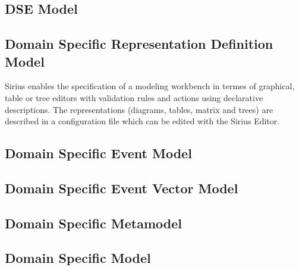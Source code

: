 \documentclass{gemoc} %
\begin{document}

\subsection{DSE Model}
\label{sec:DSE_Model}


\subsection{Domain Specific  Representation Definition Model}
\label{sec:Domain_Specific__Representation_Definition_Model}
Sirius enables the specification of a modeling workbench in termes of graphical, table or tree editors with validation rules and actions using declarative descriptions. The representations (diagrams, tables, matrix and trees) are described in a configuration file which can be edited with the Sirius Editor.

\subsection{Domain Specific Event Model}
\label{sec:Domain_Specific_Event_Model}


\subsection{Domain Specific Event Vector Model}
\label{sec:Domain_Specific_Event_Vector_Model}


\subsection{Domain Specific Metamodel}
\label{sec:Domain_Specific_Metamodel}


\subsection{Domain Specific Model}
\label{sec:Domain_Specific_Model}
\end{document}
